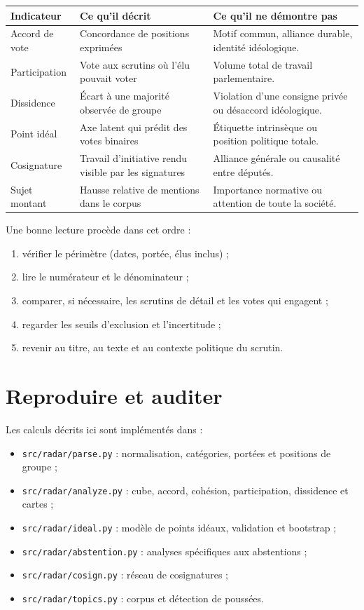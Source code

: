 \documentclass[11pt,a4paper]{article}
\newcommand{\code}[1]{\texttt{#1}}
\begin{document}
\begin{center}
\begin{tabular}{>{\raggedright\arraybackslash}p{.25\linewidth}p{.31\linewidth}p{.31\linewidth}}
\toprule
Indicateur & Ce qu'il décrit & Ce qu'il ne démontre pas \\
\midrule
Accord de vote & Concordance de positions exprimées & Motif commun, alliance durable, identité idéologique. \\
Participation & Vote aux scrutins où l'élu pouvait voter & Volume total de travail parlementaire. \\
Dissidence & Écart à une majorité observée de groupe & Violation d'une consigne privée ou désaccord idéologique. \\
Point idéal & Axe latent qui prédit des votes binaires & Étiquette intrinsèque ou position politique totale. \\
Cosignature & Travail d'initiative rendu visible par les signatures & Alliance générale ou causalité entre députés. \\
Sujet montant & Hausse relative de mentions dans le corpus & Importance normative ou attention de toute la société. \\
\bottomrule
\end{tabular}
\end{center}

Une bonne lecture procède dans cet ordre :

\begin{enumerate}
  \item vérifier le périmètre (dates, portée, élus inclus) ;
  \item lire le numérateur et le dénominateur ;
  \item comparer, si nécessaire, les scrutins de détail et les votes qui engagent ;
  \item regarder les seuils d'exclusion et l'incertitude ;
  \item revenir au titre, au texte et au contexte politique du scrutin.
\end{enumerate}

\section{Reproduire et auditer}\label{sec:reproduire}

Les calculs décrits ici sont implémentés dans :

\begin{itemize}
  \item \code{src/radar/parse.py} : normalisation, catégories, portées et
  positions de groupe ;
  \item \code{src/radar/analyze.py} : cube, accord, cohésion, participation,
  dissidence et cartes ;
  \item \code{src/radar/ideal.py} : modèle de points idéaux, validation et
  bootstrap ;
  \item \code{src/radar/abstention.py} : analyses spécifiques aux abstentions ;
  \item \code{src/radar/cosign.py} : réseau de cosignatures ;
  \item \code{src/radar/topics.py} : corpus et détection de poussées.
\end{itemize}
\end{document}
